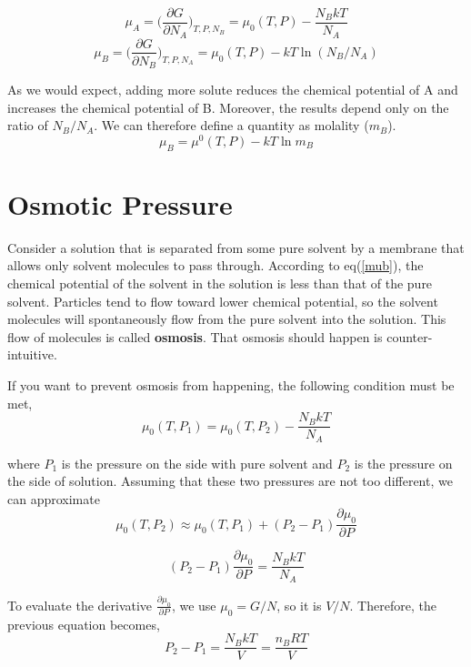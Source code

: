 \begin{equation}
\mu_A = \bigg(\frac{\partial G}{\partial N_A}\bigg)_{T, P, N_B} = \mu_0(T, P) - \frac{N_BkT}{N_A}  
\end{equation}
\begin{equation}
\mu_B = \bigg(\frac{\partial G}{\partial N_B}\bigg)_{T, P, N_A} = \mu_0(T, P) - kT\ln(N_B/N_A)  
\end{equation}

As we would expect, adding more solute reduces the chemical potential of A and increases the chemical potential of B. Moreover, the results depend only on the ratio of $N_B/N_A$. We can therefore define a quantity as molality ($m_B$). 
\begin{equation}\label{mub}
\mu_B = \mu^0(T, P) - kT\ln m_B  
\end{equation}

\section{Osmotic Pressure}
Consider a solution that is separated from some pure solvent by a membrane that allows only solvent molecules to pass through. According to eq(\ref{mub}), the chemical potential of the solvent in the solution is less than that of the pure solvent. Particles tend to flow toward lower chemical potential, so the solvent molecules will spontaneously flow from the pure solvent into the solution. This flow of molecules is called \textbf{osmosis}. That osmosis should happen is counter-intuitive. 

If you want to prevent osmosis from happening, the following condition must be met,
\begin{equation}\label{mub}
\mu_0(T, P_1) = \mu_0(T, P_2) - \frac{N_BkT}{N_A}  
\end{equation}

where $P_1$ is the pressure on the side with pure solvent and $P_2$ is the pressure on the side of solution. Assuming that these two pressures are not too different, we can approximate
\begin{equation}\label{mub}
\mu_0(T, P_2) \approx \mu_0(T, P_1) + (P_2 - P_1) \frac{\partial \mu_0}{\partial P}  
\end{equation}

\begin{equation}
    (P_2 - P_1)\frac{\partial \mu_0}{\partial P} = \frac{N_BkT}{N_A}
\end{equation}

To evaluate the derivative $\frac{\partial \mu_0}{\partial P}$, we use $\mu_0 = G/N$, so it is $V/N$. 
Therefore, the previous equation becomes,
\begin{equation}
    P_2 - P_1 = \frac{N_BkT}{V} = \frac{n_BRT}{V}
\end{equation}

